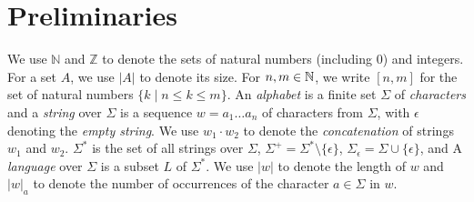 \documentclass[sigplan,review,anonymous]{acmart}\settopmatter{printfolios=true,printccs=false,printacmref=false}
\begin{document}
\section{Preliminaries} \label{section:preliminary}
%


We use $\mathbb{N}$ and $\mathbb{Z}$ to denote the sets of natural numbers (including 0) and 
integers. For a set $A$, we use $|A|$ to denote its size. 
For $n,m\in\mathbb{N}$, we write $[n,m]$ for the set of natural numbers 
$\{k\mid n\leq k \leq m\}$. 
An \emph{alphabet} is a finite set $\Sigma$ of \emph{characters} and a \emph{string} over $\Sigma$ is a sequence $w = a_1\ldots a_n$ of characters from $\Sigma$, with $\epsilon$ denoting the \emph{empty string}. 
We use $w_1\cdot w_2$ to denote the \emph{concatenation} of strings $w_1$ and $w_2$.
$\Sigma^*$ is the set of all strings over $\Sigma$, $\Sigma^+ = \Sigma^*\setminus \{\epsilon\}$, $\Sigma_\epsilon = \Sigma\cup\{\epsilon\}$, and 
A \emph{language} over $\Sigma$ is a subset $L$ of $\Sigma^*$.  
%
We use $|w|$ to denote the length of $w$ and $|w|_a$ to denote the number of occurrences of the character $a\in \Sigma$ in $w$.  
\end{document}
